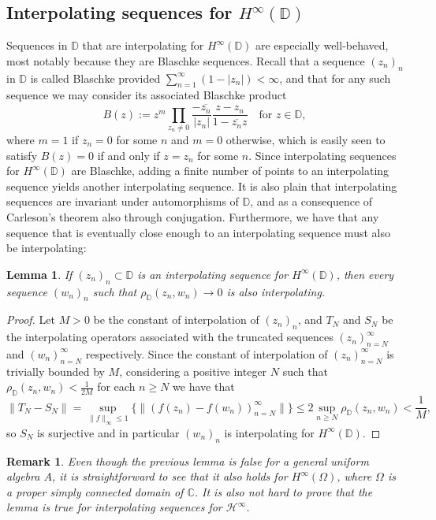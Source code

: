 \documentclass[preprint,12pt,number]{elsarticle}
\newtheorem{lemma}[theorem]{Lemma}
\newtheorem{remark}[theorem]{Remark}
\newcommand{\C}{\mathbb{C}}
\newcommand{\D}{\mathbb{D}}
\begin{document}
\subsection{Interpolating sequences for $H^\infty(\D)$} 
\vspace{0.3cm}
Sequences in $\D$ that are interpolating for $H^\infty(\D)$ are especially well-behaved, most notably because they are Blaschke sequences. Recall that a sequence $(z_n)_n$ in $\D$ is called Blaschke provided $\sum_{n=1}^\infty (1-|z_n|)<\infty$, and that for any such sequence we may consider its associated Blaschke product 
\[
B(z):=z^m\prod_{z_n\neq 0}\frac{-\overline{z_n}}{|z_n|}\frac{z-z_n}{1-\overline{z_n}z}\quad \text{for } z\in\D,
\] 
where $m=1$ if $z_n=0$ for some $n$ and $m=0$ otherwise, which is easily seen to satisfy $B(z)=0$ if and only if $z=z_n$ for some $n$. Since interpolating sequences for $H^\infty(\D)$ are Blaschke, adding a finite number of points to an interpolating sequence yields another interpolating sequence. It is also plain that interpolating sequences are invariant under automorphisms of $\D$, and as a consequence of Carleson's theorem also through conjugation. Furthermore, we have that any sequence that is eventually close enough to an interpolating sequence must also be interpolating:

\begin{lemma}\label{estab-int}
    If $(z_n)_n\subset \D$ is an interpolating sequence for $H^\infty(\D)$, then every sequence $(w_n)_n$ such that $\rho_\D(z_n,w_n)\rightarrow0$ is also interpolating. 
\end{lemma}
\begin{proof}
Let $M>0$ be the constant of interpolation of $(z_n)_n$, and $T_N$ and $S_N$ be the interpolating operators associated with the truncated sequences $(z_n)_{n=N}^\infty$ and $(w_n)_{n=N}^\infty$ respectively. Since the constant of interpolation of $(z_n)_{n=N}^\infty$ is trivially bounded by $M$, considering a positive integer $N$ such that $\rho_\D(z_n,w_n)<\frac{1}{2M}$ for each $n\geq N$ we have that 
\[
\lVert T_N-S_N \rVert=\sup_{\lVert f \rVert_\infty\leq1}\{ \lVert (f(z_n)-f(w_n))_{n=N}^\infty \rVert \}\leq 2 \sup_{n\geq N}\rho_\D(z_n,w_n)<\frac{1}{M},
\] 
so $S_N$ is surjective and in particular $(w_n)_n$ is interpolating for $H^\infty(\D)$.
\end{proof}

\begin{remark}
    Even though the previous lemma is false for a general uniform algebra $A$, it is straightforward to see that it also holds for $H^\infty(\Omega)$, where $\Omega$ is a proper simply connected domain of $\C$. It is also not hard to prove that the lemma is true for interpolating sequences for $\mathscr{H}^\infty$.
\end{remark}
\end{document}
